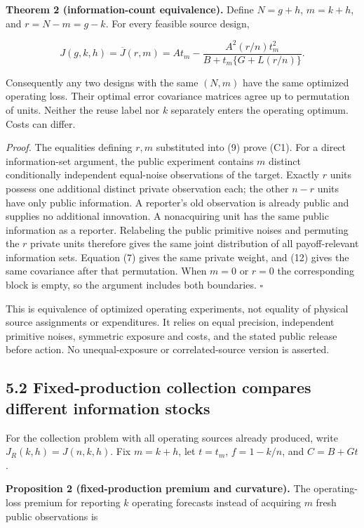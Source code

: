 \documentclass[
  11pt,
]{article}
\begin{document}
\textbf{Theorem 2 (information-count equivalence).} Define \(N=g+h\),
\(m=k+h\), and \(r=N-m=g-k\). For every feasible source design,

\[J(g,k,h)=\overline J(r,m)
=At_m-\frac{A^2(r/n)t_m^2}{B+t_m\{G+L(r/n)\}}. \tag{C1}\]

Consequently any two designs with the same \((N,m)\) have the same
optimized operating loss. Their optimal error covariance matrices agree
up to permutation of units. Neither the reuse label nor \(k\) separately
enters the operating optimum. Costs can differ.

\emph{Proof.} The equalities defining \(r,m\) substituted into (9) prove
(C1). For a direct information-set argument, the public experiment
contains \(m\) distinct conditionally independent equal-noise
observations of the target. Exactly \(r\) units possess one additional
distinct private observation each; the other \(n-r\) units have only
public information. A reporter's old observation is already public and
supplies no additional innovation. A nonacquiring unit has the same
public information as a reporter. Relabeling the public primitive noises
and permuting the \(r\) private units therefore gives the same joint
distribution of all payoff-relevant information sets. Equation (7) gives
the same private weight, and (12) gives the same covariance after that
permutation. When \(m=0\) or \(r=0\) the corresponding block is empty,
so the argument includes both boundaries. \(\square\)

This is equivalence of optimized operating experiments, not equality of
physical source assignments or expenditures. It relies on equal
precision, independent primitive noises, symmetric exposure and costs,
and the stated public release before action. No unequal-exposure or
correlated-source version is asserted.

\subsection{5.2 Fixed-production collection compares different
information
stocks}\label{fixed-production-collection-compares-different-information-stocks}

For the collection problem with all operating sources already produced,
write \(J_R(k,h)=J(n,k,h)\). Fix \(m=k+h\), let \(t=t_m\), \(f=1-k/n\),
and \(C=B+Gt\).

\textbf{Proposition 2 (fixed-production premium and curvature).} The
operating-loss premium for reporting \(k\) operating forecasts instead
of acquiring \(m\) fresh public observations is
\end{document}
